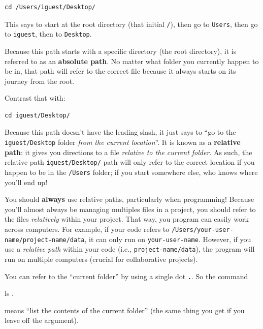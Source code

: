 \documentclass[]{book}
\newenvironment{Shaded}{\begin{snugshade}}{\end{snugshade}}
\newcommand{\FunctionTok}[1]{\textcolor[rgb]{0.00,0.00,0.00}{#1}}
\newcommand{\NormalTok}[1]{#1}
\theoremstyle{definition}
\theoremstyle{definition}
\theoremstyle{remark}
\begin{document}
\begin{verbatim}
cd /Users/iguest/Desktop/
\end{verbatim}

This says to start at the root directory (that initial \texttt{/}), then
go to \texttt{Users}, then go to \texttt{iguest}, then to
\texttt{Desktop}.

Because this path starts with a specific directory (the root directory),
it is referred to as an \textbf{absolute path}. No matter what folder
you currently happen to be in, that path will refer to the correct file
because it always starts on its journey from the root.

Contrast that with:

\begin{verbatim}
cd iguest/Desktop/
\end{verbatim}

Because this path doesn't have the leading slash, it just says to ``go
to the \texttt{iguest/Desktop} folder \emph{from the current
location}''. It is known as a \textbf{relative path}: it gives you
directions to a file \emph{relative to the current folder}. As such, the
relative path \texttt{iguest/Desktop/} path will only refer to the
correct location if you happen to be in the \texttt{/Users} folder; if
you start somewhere else, who knows where you'll end up!

You should \textbf{always} use relative paths, particularly when
programming! Because you'll almost always be managing multiples files in
a project, you should refer to the files \emph{relatively} within your
project. That way, you program can easily work across computers. For
example, if your code refers to
\texttt{/Users/your-user-name/project-name/data}, it can only run on
\texttt{your-user-name}. However, if you use a \emph{relative path}
within your code (i.e., \texttt{project-name/data}), the program will
run on multiple computers (crucial for collaborative projects).

You can refer to the ``current folder'' by using a single dot
\textbf{\texttt{.}}. So the command

\begin{Shaded}
\begin{Highlighting}[]
\FunctionTok{ls}\NormalTok{ .}
\end{Highlighting}
\end{Shaded}

means ``list the contents of the current folder'' (the same thing you
get if you leave off the argument).
\end{document}

